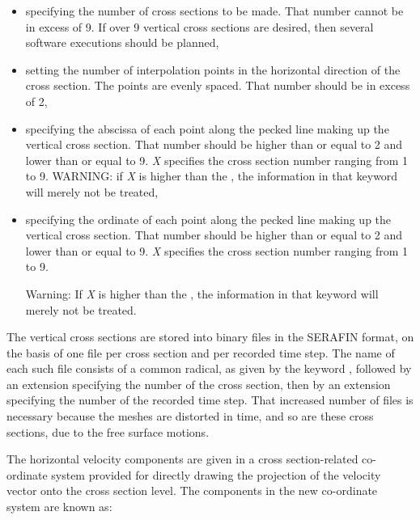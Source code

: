 \begin{itemize}
\item {} specifying the number of
cross sections to be made. That number cannot be in excess of 9. If over 9
vertical cross sections are desired, then several software executions should be
planned,

\item {}
setting the number of interpolation points in the horizontal direction of the
cross section. The points are evenly spaced. That number should be in excess of
2,

\item {} specifying the
abscissa of each point along the pecked line making up the vertical cross
section. That number should be higher than or equal to 2 and lower than or
equal to 9. \textit{X} specifies the cross section number ranging from 1 to 9.
WARNING: if \textit{X} is higher than the , the information in that keyword will merely not be treated,

\item {} specifying the
ordinate of each point along the pecked line making up the vertical cross
section. That number should be higher than or equal to 2 and lower than or
equal to 9. \textit{X} specifies the cross section number ranging from 1 to 9.

\begin{WarningBlock}{Warning:}
If \textit{X} is higher than the ,
the information in that keyword will merely not be treated.
\end{WarningBlock}
\end{itemize}

The vertical cross sections are stored into binary files in the SERAFIN format,
on the basis of one file per cross section and per recorded time step. The name
of each such file consists of a common radical, as given by the keyword
, followed by an extension specifying the
number of the cross section, then by an extension specifying the number of the
recorded time step. That increased number of files is necessary because the
meshes are distorted in time, and so are these cross sections, due to the free
surface motions.

The horizontal velocity components are given in a cross section-related
co-ordinate system provided for directly drawing the projection of the velocity
vector onto the cross section level. The components in the new co-ordinate
system are known as:

